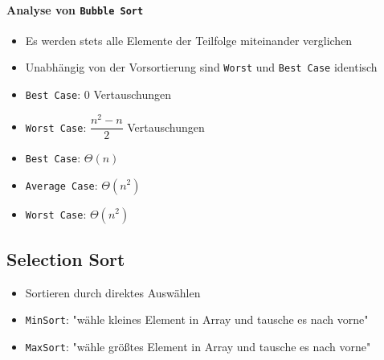 \documentclass[
    ngerman,
    color=3b,
    dark_mode,
    load_common, %
    summary,
    boxarc,
]{rubos-tuda-template}
\begin{document}
\paragraph{Analyse von \texttt{Bubble Sort}}
\begin{description}[leftmargin=5cm,itemsep=1em]
    \item [Anzahl der Vergleiche]
          \begin{itemize}
              \item Es werden stets alle Elemente der Teilfolge miteinander verglichen
              \item Unabhängig von der Vorsortierung sind \texttt{Worst} und \texttt{Best Case} identisch
          \end{itemize}

    \item [Anzahl der Vertauschungen]
          \begin{itemize}
              \item \texttt{Best Case}: 0 Vertauschungen
              \item \texttt{Worst Case}: $\dfrac{n^2-n}{2}$ Vertauschungen
          \end{itemize}

    \item [Komplexität]
          \begin{itemize}
              \item \texttt{Best Case}: $\Theta(n)$
              \item \texttt{Average Case}: $\Theta(n^2)$
              \item \texttt{Worst Case}: $\Theta(n^2)$
          \end{itemize}
\end{description}

\subsection{Selection Sort}\label{Selection sort}
\begin{idea}
    \begin{itemize}
        \item Sortieren durch direktes Auswählen
        \item \texttt{MinSort}: "wähle kleines Element in Array und tausche es nach vorne"
        \item \texttt{MaxSort}: "wähle grö\ss{}tes Element in Array und tausche es nach vorne"
    \end{itemize}
\end{idea}
\end{document}
